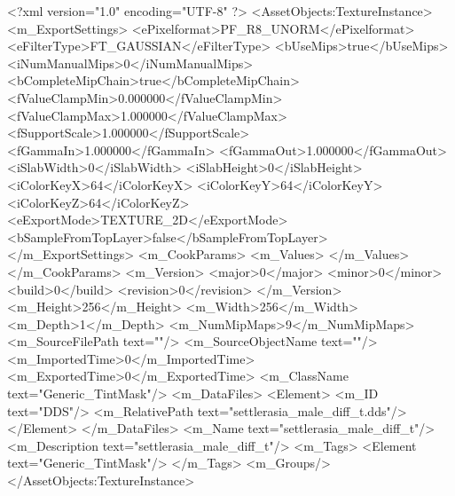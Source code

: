 <?xml version="1.0" encoding="UTF-8" ?>
<AssetObjects:TextureInstance>
<m_ExportSettings>
<ePixelformat>PF_R8_UNORM</ePixelformat>
<eFilterType>FT_GAUSSIAN</eFilterType>
<bUseMips>true</bUseMips>
<iNumManualMips>0</iNumManualMips>
<bCompleteMipChain>true</bCompleteMipChain>
<fValueClampMin>0.000000</fValueClampMin>
<fValueClampMax>1.000000</fValueClampMax>
<fSupportScale>1.000000</fSupportScale>
<fGammaIn>1.000000</fGammaIn>
<fGammaOut>1.000000</fGammaOut>
<iSlabWidth>0</iSlabWidth>
<iSlabHeight>0</iSlabHeight>
<iColorKeyX>64</iColorKeyX>
<iColorKeyY>64</iColorKeyY>
<iColorKeyZ>64</iColorKeyZ>
<eExportMode>TEXTURE_2D</eExportMode>
<bSampleFromTopLayer>false</bSampleFromTopLayer>
</m_ExportSettings>
<m_CookParams>
<m_Values>
</m_Values>
</m_CookParams>
<m_Version>
<major>0</major>
<minor>0</minor>
<build>0</build>
<revision>0</revision>
</m_Version>
<m_Height>256</m_Height>
<m_Width>256</m_Width>
<m_Depth>1</m_Depth>
<m_NumMipMaps>9</m_NumMipMaps>
<m_SourceFilePath text=""/>
<m_SourceObjectName text=""/>
<m_ImportedTime>0</m_ImportedTime>
<m_ExportedTime>0</m_ExportedTime>
<m_ClassName text="Generic_TintMask"/>
<m_DataFiles>
<Element>
<m_ID text="DDS"/>
<m_RelativePath text="settlerasia_male_diff_t.dds"/>
</Element>
</m_DataFiles>
<m_Name text="settlerasia_male_diff_t"/>
<m_Description text="settlerasia_male_diff_t"/>
<m_Tags>
<Element text="Generic_TintMask"/>
</m_Tags>
<m_Groups/>
</AssetObjects:TextureInstance>
